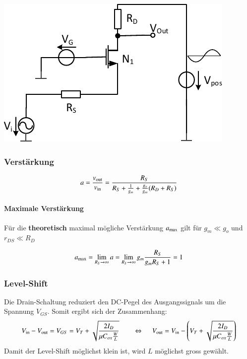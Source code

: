 \begin{minipage}[t]{0.4\columnwidth}
    \includegraphics[width=\columnwidth, align=t]{images/03_drain_schaltung.pdf}
\end{minipage}
\hfill
\begin{minipage}[t]{0.58\columnwidth}
    \subsubsection{Verstärkung}

    \vspace{-0.2cm}
    \[
        a = \frac{v_{\rm out}}{v_{\rm in}} = \frac{R_S}{R_S + \frac{1}{g_m} + \frac{g_o}{g_m} (R_D + R_S)}
    \]

    \paragraph{Maximale Verstärkung}

    Für die \textbf{theoretisch} maximal mögliche Verstärkung $a_{\rm max}$ gilt für
    $g_m \ll g_o$ und $r_{DS} \ll R_D$

    \vspace{-0.2cm}

    \[
        a_{\rm max} = \lim_{R_S \to \infty} a = \lim_{R_S \to \infty} g_m \frac{R_S}{g_m R_S + 1} = 1
    \]
\end{minipage}


\subsubsection{Level-Shift}
Die Drain-Schaltung reduziert den DC-Pegel des Ausgangssignals um die Spannung $V_{GS}$. Somit ergibt sich der Zusammenhang:
\[
    V_{\rm in} - V_{\rm out} =  V_{GS} = V_T + \sqrt{\frac{2 I_D}{\mu C_{ox} \frac{W}{L}}} \qquad \Leftrightarrow\ \quad  V_{\rm out} = V_{\rm in} - \left( V_T + \sqrt{\frac{2 I_D}{\mu C_{ox} \frac{W}{L}}} \right)
\]
Damit der Level-Shift möglichst klein ist, wird $L$ möglichst gross gewählt.


